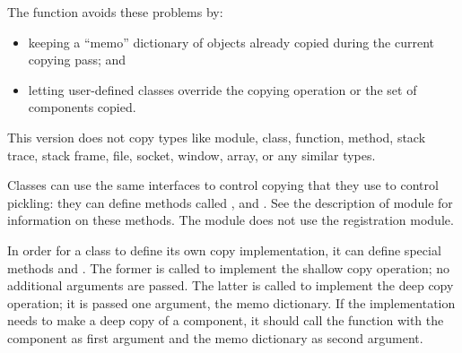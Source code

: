 The  function avoids these problems by:

\begin{itemize}

\item
keeping a ``memo'' dictionary of objects already copied during the current
copying pass; and

\item
letting user-defined classes override the copying operation or the
set of components copied.

\end{itemize}

This version does not copy types like module, class, function, method,
stack trace, stack frame, file, socket, window, array, or any similar
types.

Classes can use the same interfaces to control copying that they use
to control pickling: they can define methods called
,  and
.  See the description of module
 for information on these
methods.  The  module does not use the
 registration module.

In order for a class to define its own copy implementation, it can
define special methods  and
.  The former is called to implement the
shallow copy operation; no additional arguments are passed.  The
latter is called to implement the deep copy operation; it is passed
one argument, the memo dictionary.  If the 
implementation needs to make a deep copy of a component, it should
call the  function with the component as first
argument and the memo dictionary as second argument.

\begin{seealso}
\end{seealso}
